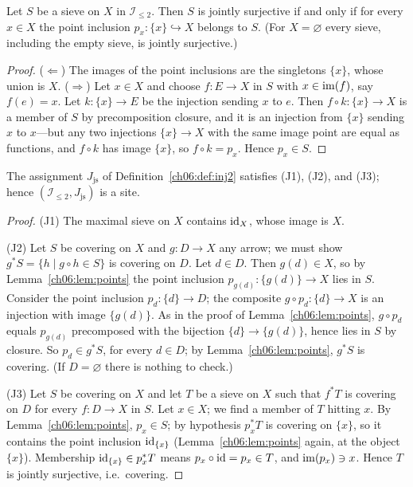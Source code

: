 \begin{lemma}
\label{ch06:lem:points}
Let $S$ be a sieve on $X$ in $\mathcal{I}_{\le 2}$. Then $S$ is jointly
surjective if and only if for every $x\in X$ the point inclusion
$p_x:\{x\}\hookrightarrow X$ belongs to $S$. (For $X=\varnothing$ every
sieve, including the empty sieve, is jointly surjective.)
\end{lemma}

\begin{proof}
($\Leftarrow$) The images of the point inclusions are the singletons
$\{x\}$, whose union is $X$. ($\Rightarrow$) Let $x\in X$ and choose
$f:E\to X$ in $S$ with $x\in\mathrm{im}(f)$, say $f(e)=x$. Let $k:\{x\}\to E$ be the
injection sending $x$ to $e$. Then $f\circ k:\{x\}\to X$ is a member of $S$
by precomposition closure, and it is an injection from $\{x\}$ sending $x$
to $x$---but any two injections $\{x\}\to X$ with the same image point are
equal as functions, and $f\circ k$ has image $\{x\}$, so $f\circ k=p_x$.
Hence $p_x\in S$.
\end{proof}

\begin{proposition}
\label{ch06:prop:topology}
The assignment $J_{\mathrm{js}}$ of Definition~\ref{ch06:def:inj2}
satisfies (J1), (J2), and (J3); hence
$(\mathcal{I}_{\le 2},J_{\mathrm{js}})$ is a site.
\end{proposition}

\begin{proof}
(J1) The maximal sieve on $X$ contains $\mathrm{id}_X$, whose image is $X$.

(J2) Let $S$ be covering on $X$ and $g:D\to X$ any arrow; we must show
$g^{*}S=\{h \mid g\circ h\in S\}$ is covering on $D$. Let $d\in D$. Then
$g(d)\in X$, so by Lemma~\ref{ch06:lem:points} the point inclusion
$p_{g(d)}:\{g(d)\}\to X$ lies in $S$. Consider the point inclusion
$p_d:\{d\}\to D$; the composite $g\circ p_d:\{d\}\to X$ is an injection with
image $\{g(d)\}$. As in the proof of Lemma~\ref{ch06:lem:points},
$g\circ p_d$ equals $p_{g(d)}$ precomposed with the bijection
$\{d\}\to\{g(d)\}$, hence lies in $S$ by closure. So $p_d\in g^{*}S$, for
every $d\in D$; by Lemma~\ref{ch06:lem:points}, $g^{*}S$ is covering. (If
$D=\varnothing$ there is nothing to check.)

(J3) Let $S$ be covering on $X$ and let $T$ be a sieve on $X$ such that
$f^{*}T$ is covering on $D$ for every $f:D\to X$ in $S$. Let $x\in X$; we
find a member of $T$ hitting $x$. By Lemma~\ref{ch06:lem:points},
$p_x\in S$; by hypothesis $p_x^{*}T$ is covering on $\{x\}$, so it contains
the point inclusion $\mathrm{id}_{\{x\}}$ (Lemma~\ref{ch06:lem:points} again, at the
object $\{x\}$). Membership $\mathrm{id}_{\{x\}}\in p_x^{*}T$ means
$p_x\circ\mathrm{id}=p_x\in T$, and $\mathrm{im}(p_x)\ni x$. Hence $T$ is jointly
surjective, i.e.\ covering.
\end{proof}

